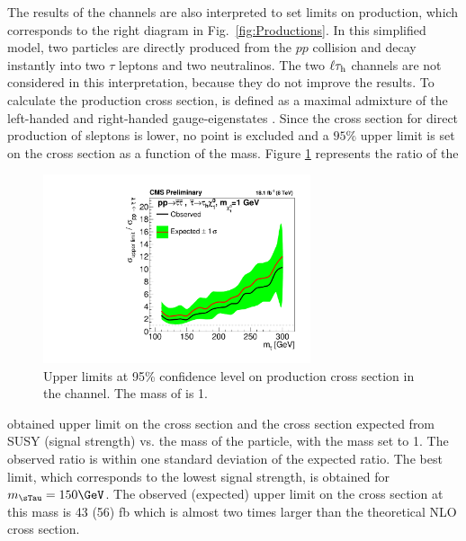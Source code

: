 The results of the \tauTau channels are also interpreted to set limits on \sTau\sTau production, 
which corresponds to the right diagram in Fig.~\ref{fig:Productions}. 
In this simplified model, two \sTau particles are directly produced from the $pp$ collision and decay instantly 
into two $\tau$ leptons and two neutralinos. 
The two $\ell\tau_{\rm h}$ channels are not considered in this interpretation, because they do not improve the results. 
To calculate the production cross section, \sTau is 
defined as a maximal admixture of the left-handed and right-handed \sTau gauge-eigenstates \cite{Fuks:2013lya}. 
Since the cross section for direct production of sleptons is lower, no point is excluded and a $95\%$ upper limit is set on 
the cross section  as a function of the \sTau mass. 
Figure \ref{fig:limit_stau_stau} represents the ratio of the 
\begin{linenomath}
\begin{figure}[!htb]
\centering
\includegraphics[width=0.7\textwidth,keepaspectratio=true]{StatisticsFig/ExclusionSTauSTauLsp1.pdf}
\caption{Upper limits at 95\% confidence level on \sTau\sTau production cross section in the \tauTau channel. The mass of \PSGczDo is 1\GeV.}
\label{fig:limit_stau_stau}
\end{figure}
\end{linenomath}
obtained upper limit on the cross section and the cross section expected from SUSY (signal strength) vs. the mass of the \sTau particle, with the \PSGczDo mass set to 1\GeV.
The observed ratio is within one standard deviation of  the expected ratio.
The best limit, which corresponds to the lowest signal strength, is obtained for $m_{\sTau}=150\GeV$. The observed (expected) upper limit on the cross section at this mass is 43 (56) fb which is almost two  times larger than the theoretical NLO cross section.



